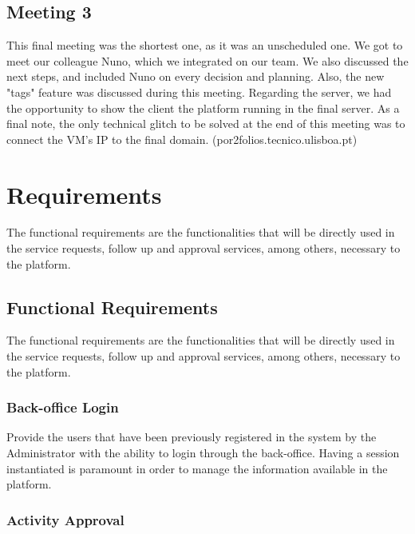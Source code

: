 \documentclass[a4paper,12pt,journal,twoside,compsoc]{PPIEEEtran}
\begin{document}
\subsection{Meeting 3}


This final meeting was the shortest one, as it was an unscheduled one. We got to meet our colleague Nuno, which we integrated on our team. We also discussed the next steps, and included Nuno on every decision and planning. Also, the new "tags" feature was discussed during this meeting.
Regarding the server, we had the opportunity to show the client the platform running in the final server.
As a final note, the only technical glitch to be solved at the end of this meeting was to connect the VM's IP to the final domain.
(por2folios.tecnico.ulisboa.pt)



\section{Requirements}

The functional requirements are the functionalities that will be directly used in the service requests, follow up and approval services, among others, necessary to the platform.

\subsection{Functional Requirements}

The functional requirements are the functionalities that will be directly used in the service requests, follow up and approval services, among others, necessary to the platform.

\subsubsection{Back-office Login}

Provide the users that have been previously registered in the system by the Administrator with the ability to login through the back-office. Having a session instantiated is paramount in order to manage the information available in the platform.

\subsubsection{Activity Approval}
\end{document}
